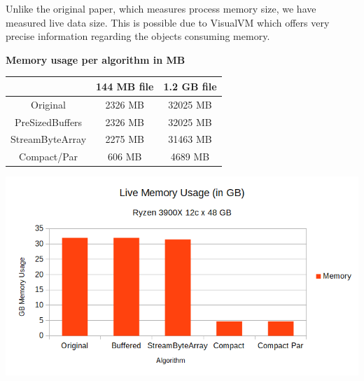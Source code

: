\documentclass[a4paper,twoside]{article}
\begin{document}
Unlike the original paper, which measures process memory size, we have measured live data size.
This is possible due to VisualVM which offers very precise information regarding the objects consuming memory.


\begin{small}
\begin{center}
\textbf{Memory usage per algorithm in MB} \\
	\begin{tabular}{|c|c|c|}
		\hline			  	& 144 MB file		& 1.2 GB file		\\ \hline
		Original			& 2326 MB			& 32025 MB			\\ \hline
		PreSizedBuffers		& 2326 MB			& 32025 MB			\\ \hline
		StreamByteArray 	& 2275 MB			& 31463 MB			\\ \hline
		Compact/Par			& 606 MB			& 4689 MB			\\ \hline
	\end{tabular}
\end{center}
\end{small}

\begin{center}
	\includegraphics[scale=0.5]{images/memory_usage_1_2G.png}
\end{center}
\end{document}
